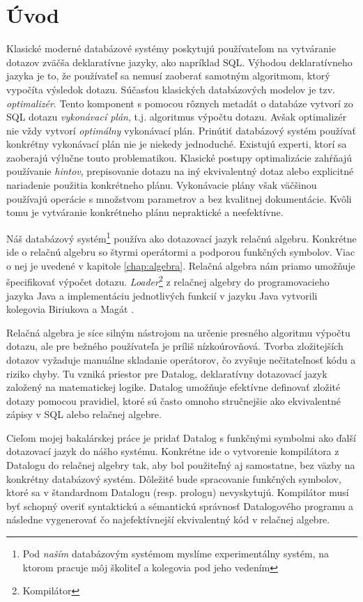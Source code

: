 \chapter*{Úvod}

Klasické moderné databázové systémy poskytujú používateľom na vytváranie dotazov zväčša deklaratívne
jazyky, ako napríklad SQL. Výhodou deklaratívneho jazyka je to, že používateľ sa nemusí zaoberať
samotným algoritmom, ktorý vypočíta výsledok dotazu. Súčasťou klasických databázových modelov je
tzv. \textit{optimalizér}.  Tento komponent s pomocou rôznych metadát o databáze vytvorí zo SQL
dotazu \textit{vykonávací plán}, t.j. algoritmus výpočtu dotazu. Avšak optimalizér nie vždy vytvorí
\textit{optimálny} vykonávací plán. Prinútiť databázový systém používať konkrétny vykonávací plán
nie je niekedy jednoduché. Existujú experti, ktorí sa zaoberajú výlučne touto problematikou.
Klasické postupy optimalizácie zahŕňajú používanie \textit{hintov}, prepisovanie dotazu na iný
ekvivalentný dotaz alebo explicitné nariadenie použitia konkrétneho plánu. Vykonávacie plány však
väčšinou používajú operácie s množstvom parametrov a bez kvalitnej dokumentácie. Kvôli tomu je
vytváranie konkrétneho plánu nepraktické a neefektívne.

Náš databázový systém\footnote{Pod \textit{naším} databázovým systémom myslíme experimentálny systém,
na ktorom pracuje môj školiteľ a kolegovia pod jeho vedením} používa ako dotazovací jazyk relačnú
algebru. Konkrétne ide o relačnú algebru so štyrmi operátormi a podporou funkčných symbolov. Viac o
nej je uvedené v kapitole \ref{chap:algebra}. Relačná algebra nám priamo umožňuje špecifikovať
výpočet dotazu. \textit{Loader}\footnote{Kompilátor} z relačnej algebry do programovacieho jazyka
Java a implementáciu jednotlivých funkcií v jazyku Java vytvorili kolegovia Biriukova
\cite{RAcompilator} a Magát \cite{JAVAimple}.

Relačná algebra je síce silným nástrojom na určenie presného algoritmu výpočtu dotazu, ale pre
bežného používateľa je príliš nízkoúrovňová. Tvorba zložitejších dotazov vyžaduje manuálne skladanie
operátorov, čo zvyšuje nečitateľnosť kódu a riziko chyby. Tu vzniká priestor pre Datalog,
deklaratívny dotazovací jazyk založený na matematickej logike. Datalog umožňuje efektívne definovať
zložité dotazy pomocou pravidiel, ktoré sú často omnoho stručnejšie ako ekvivalentné zápisy v SQL
alebo relačnej algebre.

Cieľom mojej bakalárskej práce je pridať Datalog s funkčnými symbolmi ako ďalší dotazovací jazyk do
nášho systému. Konkrétne ide o vytvorenie kompilátora z Datalogu do relačnej algebry tak, aby bol
použiteľný aj samostatne, bez väzby na konkrétny databázový systém. Dôležité bude spracovanie
funkčných symbolov, ktoré sa v štandardnom Datalogu (resp. prologu) nevyskytujú. Kompilátor musí byť
schopný overiť syntaktickú a sémantickú správnosť Datalogového programu a následne vygenerovať čo
najefektívnejší ekvivalentný kód v relačnej algebre.


